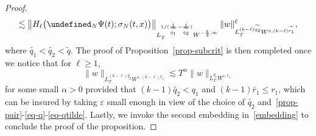 \documentclass[AHL,Unicode,longabstracts,published]{cedram}
\let\P= \undefined
\newcommand{\P}{\mathbf{P}}
\newcommand{\al}{\alpha}
\newcommand{\eps}{\varepsilon}
\newcommand{\s}{\sigma}
\newcommand{\les}{\lesssim}
\begin{document}
\begin{proof}
\begin{multline*}
\les \left\|H_{\ell}\big(\P_N\Psi(t);\s_N(t,x)\big)\right\|_{L^{1/(\frac1{\widetilde{q_1}}-\frac1{\widetilde{q_2}})}_TW^{-\frac\eps2,\infty}} \|w\|_{L^{(k-\ell) \widetilde{q_2}}_TW^{\eps,(k-\ell) \widetilde{r_1}}}^{\ell},
\end{multline*}
where $\widetilde{q_1}<\widetilde{q_2}<\widetilde{q}$. The proof of Proposition~\ref{prop-subcrit} is then completed once we notice that for $\ell\ge 1$,
\begin{equation*}
\|w\|_{L^{(k-\ell) \widetilde{q_2}}_TW^{\eps,(k-\ell) \widetilde{r_1}}} \les T^\al\|w\|_{L^{q_1}_TW^{\eps,r_1}}
\end{equation*}
for some small $\al >0$ provided that $(k-1)\widetilde{q_2}<q_1$ and $(k-1)\widetilde{r_1}\leq r_1$, which can be insured by taking $\eps$ small enough in view of the choice of $\widetilde{q_2}$ and~\eqref{prop-pair}-\eqref{eq-q}-\eqref{eq-qtilde}. Lastly, we invoke the second embedding in~\eqref{embedding} to conclude the proof of the proposition.
\end{proof}
\end{document}
